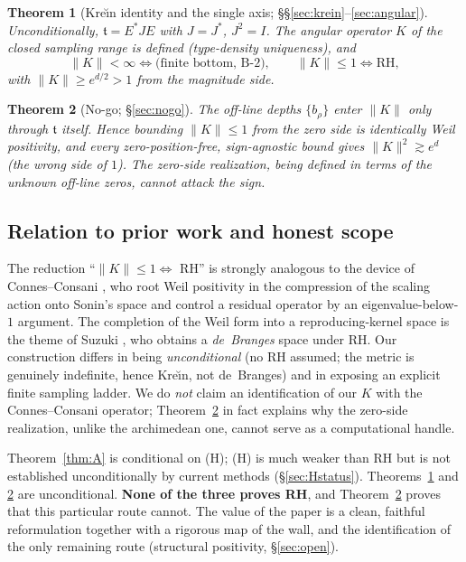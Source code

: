 \documentclass[11pt]{amsart}
\newtheorem{theorem}{Theorem}[section]
\theoremstyle{definition}
\theoremstyle{remark}
\newcommand{\tform}{\mathfrak t}
\newcommand{\Kop}{K}
\newcommand{\Norm}[1]{\lVert #1 \rVert}
\begin{document}
\begin{theorem}[Kre\u{\i}n identity and the single axis; \S\S\ref{sec:krein}--\ref{sec:angular}]\label{thm:B}
Unconditionally, $\tform=E^{*}JE$ with $J=J^{*}$, $J^{2}=I$. The angular operator
$\Kop$ of the closed sampling range is defined (type-density uniqueness), and
\[
\Norm{\Kop}<\infty\iff \text{(finite bottom, B-2)},\qquad
\Norm{\Kop}\le1\iff \mathrm{RH},
\]
with $\Norm{\Kop}\ge e^{d/2}>1$ from the magnitude side.
\end{theorem}

\begin{theorem}[No-go; \S\ref{sec:nogo}]\label{thm:C}
The off-line depths $\{b_\rho\}$ enter $\Norm{\Kop}$ only through $\tform$ itself. Hence
bounding $\Norm{\Kop}\le1$ from the zero side is identically Weil positivity, and every
zero-position-free, sign-agnostic bound gives $\Norm{\Kop}^{2}\gtrsim e^{d}$ (the wrong
side of $1$). The zero-side realization, being defined in terms of the unknown off-line
zeros, cannot attack the sign.
\end{theorem}

\subsection{Relation to prior work and honest scope}
The reduction ``$\Norm{\Kop}\le1\iff$ RH'' is strongly analogous to the device of
Connes--Consani \cite{ConnesConsani}, who root Weil positivity in the compression of the
scaling action onto Sonin's space and control a residual operator by an
eigenvalue-below-$1$ argument. The completion of the Weil form into a reproducing-kernel
space is the theme of Suzuki \cite{Suzuki}, who obtains a \emph{de~Branges} space under
RH. Our construction differs in being \emph{unconditional} (no RH assumed; the metric is
genuinely indefinite, hence Kre\u{\i}n, not de~Branges) and in exposing an explicit
finite sampling ladder. We do \emph{not} claim an identification of our $\Kop$ with the
Connes--Consani operator; Theorem~\ref{thm:C} in fact explains why the zero-side
realization, unlike the archimedean one, cannot serve as a computational handle.

Theorem~\ref{thm:A} is conditional on (H); (H) is much weaker than RH but is not
established unconditionally by current methods (\S\ref{sec:Hstatus}). Theorems~\ref{thm:B}
and \ref{thm:C} are unconditional. \textbf{None of the three proves RH}, and
Theorem~\ref{thm:C} proves that this particular route cannot. The value of the paper is a
clean, faithful reformulation together with a rigorous map of the wall, and the
identification of the only remaining route (structural positivity, \S\ref{sec:open}).
\end{document}
